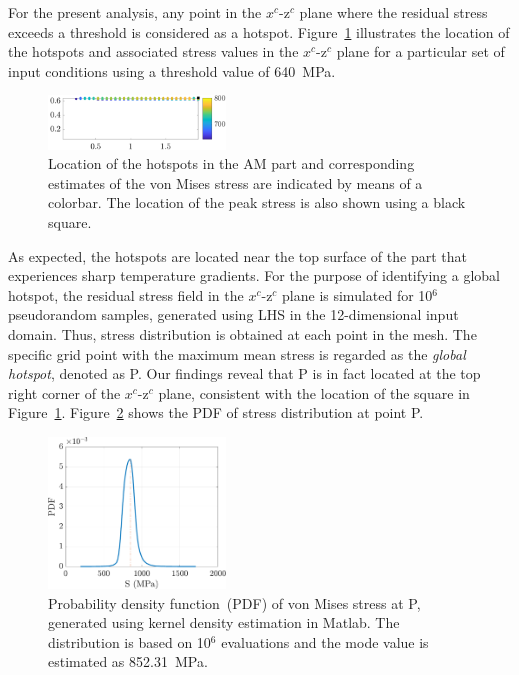 For the present analysis, any point in the $x^c$-z$^c$ plane
where the residual stress exceeds a threshold is considered as a hotspot. Figure~\ref{fig:hs} illustrates the 
location of the hotspots and associated stress values in the $x^c$-z$^c$ plane for a particular set of
input conditions using a threshold value of 640~MPa. 
%
\begin{figure}[htbp]
\begin{center}
\includegraphics[width=0.42\textwidth]{./Figures/loc_hotspot10}
\end{center}
\caption{Location of the hotspots in the AM part and corresponding estimates of the von Mises stress
are indicated by means of a colorbar. The location of the peak stress is also shown using a black square.}
\label{fig:hs}
\end{figure}
%
As expected, the hotspots are located near the top surface of the part that experiences sharp temperature
gradients. For the purpose of identifying a global hotspot, the residual stress
field in the $x^c$-z$^c$ plane is simulated for 10$^6$ pseudorandom samples, generated using LHS
in the 12-dimensional input domain. Thus, stress distribution is obtained at each point in the mesh. 
The specific grid point with the maximum mean stress is regarded as the \textit{global hotspot},
denoted as P. Our findings reveal that P is in fact located at the top right corner of the $x^c$-z$^c$
plane, consistent with the location of the square in Figure~\ref{fig:hs}.
Figure~\ref{fig:kde_S} shows the PDF of stress distribution at point P. 
%
\begin{figure}[htbp]
\begin{center}
\includegraphics[width=0.42\textwidth]{./Figures/kde_S_mumax}
\end{center}
\caption{Probability density function~(PDF) of von Mises stress at P, generated using kernel density estimation in 
Matlab. The distribution is based on 10$^6$ evaluations and the mode value is estimated as 852.31~MPa.}
\label{fig:kde_S}
\end{figure}

